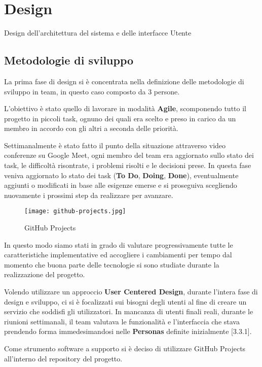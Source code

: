 \section{Design}
Design dell'architettura del sistema e delle interfacce Utente

\subsection{Metodologie di sviluppo}
La prima fase di design si è concentrata nella definizione delle metodologie di sviluppo in team, in questo caso composto da 3 persone.

L'obiettivo è stato quello di lavorare in modalità \textbf{Agile}, scomponendo tutto il progetto in piccoli task, 
ognuno dei quali era scelto e preso in carico da un membro in accordo con gli altri a seconda delle priorità.

Settimanalmente è stato fatto il punto della situazione attraverso video conferenze su Google Meet, 
ogni membro del team era aggiornato sullo stato dei task, le difficoltà risontrate, i problemi risolti e le decisioni prese.
In questa fase veniva aggiornato lo stato dei task (\textbf{To Do}, \textbf{Doing}, \textbf{Done}), 
eventualmente aggiunti o modificati in base alle esigenze emerse
e si proseguiva scegliendo nuovamente i prossimi step da realizzare per avanzare.

\begin{figure}[H]
	\centering
	\texttt{[image: github-projects.jpg]}
	\caption{GitHub Projects}
	\label{fig:github-projects}
\end{figure}

In questo modo siamo stati in grado di valutare progressivamente tutte le caratteristiche implementative ed accogliere i cambiamenti per tempo
dal momento che buona parte delle tecnologie si sono studiate durante la realizzazione del progetto.

Volendo utilizzare un approccio \textbf{User Centered Design}, durante l'intera fase di design e sviluppo,
ci si è focalizzati sui bisogni degli utenti al fine di creare un servizio che soddisfi gli utilizzatori.
In mancanza di utenti finali reali, durante le riunioni settimanali, 
il team valutava le funzionalità e l'interfaccia che stava prendendo forma immedesimandosi nelle \textbf{Personas} definite inizialmente [3.3.1].

Come strumento software a supporto si è deciso di utilizzare GitHub Projects all'interno del repository del progetto.

